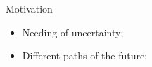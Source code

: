 \begin{frame}{Motivation}
	\begin{itemize}
		\item 
		{
			Needing of uncertainty;
			\pause
		} 
		\item 
		{
			Different paths of the future;
		}
	\end{itemize}
\end{frame}